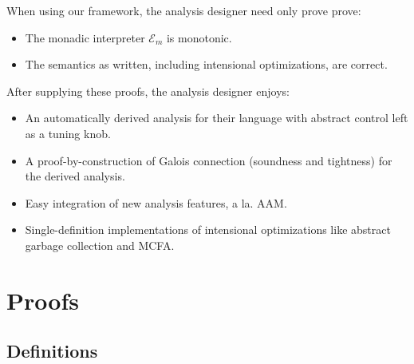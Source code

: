 \documentclass{article}
\begin{document}
When using our framework, the analysis designer need only prove prove:
\begin{itemize}
\item The monadic interpreter $ℰ_{m}$ is monotonic.
\item The semantics as written, including intensional optimizations, are correct.
\end{itemize}
After supplying these proofs, the analysis designer enjoys:
\begin{itemize}
\item An automatically derived analysis for their language with abstract control left as a tuning knob.
\item A proof-by-construction of Galois connection (soundness and tightness) for the derived analysis.
\item Easy integration of new analysis features, a la. AAM.
\item Single-definition implementations of intensional optimizations like abstract garbage collection and MCFA.
\end{itemize}


\section{Proofs}
\label{Proofs}

\subsection{Definitions}
\label{Definitions}


\end{document}
